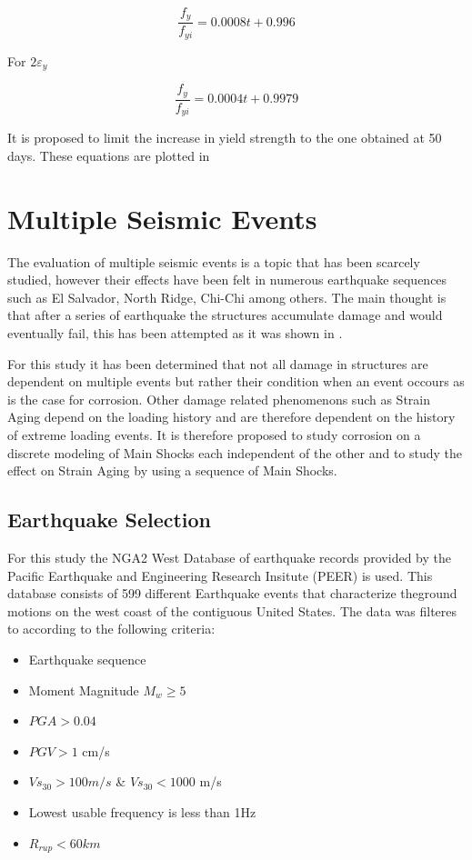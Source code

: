 \begin{equation}
  \frac{f_y}{f_{yi}}=0.0008t+0.996
  \label{eq.thirteen}
\end{equation} 

For $2\varepsilon_y$

\begin{equation}
  \frac{f_y}{f_{yi}}=0.0004t+0.9979
  \label{eq.fourteen}
\end{equation} 

It is proposed to limit the increase in yield strength to the one obtained at 50 days. These equations are plotted in 


\section{Multiple Seismic Events}

The evaluation of multiple seismic events is a topic that has been scarcely studied, however their effects have been felt in numerous earthquake sequences such as El Salvador, North Ridge, Chi-Chi among others. The main thought is that after a series of earthquake the structures accumulate damage and would eventually fail, this has been attempted as it was shown in \cite{Chapter-1}. 

For this study it has been determined that not all damage in structures are dependent on multiple events but rather their condition when an event occours as is the case for corrosion. Other damage related phenomenons such as Strain Aging depend on the loading history and are therefore dependent on the history of extreme loading events. It is therefore proposed to study corrosion on a discrete modeling of Main Shocks each independent of the other and to study the effect on Strain Aging by using a sequence of Main Shocks.

\subsection{Earthquake Selection}

For this study the NGA2 West Database of earthquake records provided by the Pacific Earthquake and Engineering Research Insitute (PEER) \cite{Ancheta2014} is used. This database consists of 599 different Earthquake events that characterize theground motions on the west coast of the contiguous United States. The data was filteres to according to the following criteria:

\begin{itemize}
	\item Earthquake sequence
	\item Moment Magnitude $M_w \geqslant 5$
	\item $PGA>0.04$
	\item $PGV>1$ cm/s
	\item $Vs_{30}>100m/s$ \& $Vs_{30}<1000$ m/s
	\item Lowest usable frequency is less than 1Hz
	\item $R_{rup}<60km$
\end{itemize}

